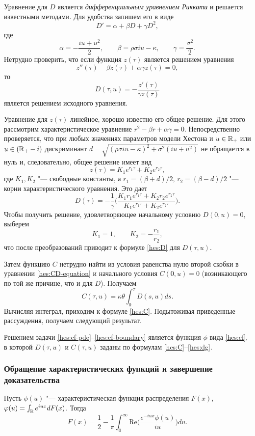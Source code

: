 Уравнение для $D$ является \emph{дифференциальным уравнением Риккати} и решается известными методами.
Для удобства запишем его в виде
\[
D'= \alpha + \beta D + \gamma D^2,
\]
где
\[
\alpha = -\frac{iu + u^2}{2},\qquad \beta = \rho\sigma iu - \kappa, \qquad
\gamma = \frac{\sigma^2}{2}.
\]
Нетрудно проверить, что если функция $z(\tau)$ является решением уравнения
\[
z''(\tau) - \beta z(\tau) + \alpha\gamma z(\tau)= 0,
\]
то
\[
D(\tau,u) = -\frac{z'(\tau)}{\gamma z(\tau)} 
\]
является решением исходного уравнения.

Уравнение для $z(\tau)$ линейное, хорошо известно его общее решение.
Для этого рассмотрим характеристическое уравнение $r^2-\beta r+\alpha\gamma = 0$.
Непосредственно проверяется, что при любых значениях параметров модели Хестона и $u\in\mathbb{R}_+$ или $u\in(\mathbb{R}_+-i)$ дискриминант $d = \sqrt{(\rho\sigma iu - \kappa)^2 + \sigma^2(iu + u^2)}$ не обращается в нуль и, следовательно, общее решение имеет вид
\[
z(\tau) = K_1 e^{r_1\tau} + K_2 e^{r_2\tau},
\]
где $K_1,K_2$ "--- свободные константы, а $r_1=(\beta+d)/2$, $r_2=(\beta-d)/2$ "--- корни характеристического уравнения.
Это дает
\[
D(\tau) = -\frac1\gamma \biggl(\frac{K_1 r_1 e^{r_1\tau} + K_2 r_2e^{r_2\tau}}{K_1 e^{r_1\tau} + K_2e^{r_2\tau}} \biggr).
\]
Чтобы получить решение, удовлетворяющее начальному условию $D(0,u)=0$, выберем
\[
K_1 = 1, \qquad K_2 = -\frac{r_1}{r_2},
\]
что после преобразований приводит к формуле \eqref{hes:D} для $D(\tau, u)$.

Затем функцию $C$ нетрудно найти из условия равенства нулю второй скобки в уравнении \eqref{hes:CD-equation} и начального условия $C(0,u)=0$ (возникающего по той же причине, что и для $D$).
Получаем
\[
C(\tau, u) = \kappa\theta \int_0^\tau D(s,u) ds.
\]
Вычисляя интеграл, приходим к формуле \eqref{hes:C}.
Подытоживая приведенные рассуждения, получаем следующий результат.

\begin{lemma}
Решением задачи \eqref{hes:cf-pde}--\eqref{hes:cf-boundary} является функция $\phi$ вида \eqref{hes:cf}, в которой $D(\tau,u)$ и $C(\tau,u)$ заданы по формулам \eqref{hes:C}--\eqref{hes:dg}.
\end{lemma}


\subsubsection{Обращение характеристических функций и завершение доказательства}

\begin{lemma} 
Пусть $\phi(u)$ "--- характеристическая функция распределения $F(x)$, \te\ $\varphi(u) = \int_{\mathbb{R}} e^{iu x} d F(x)$.
Тогда
\[
F(x) = \frac 12 - \frac1\pi 
\int_0^\infty \mathrm{Re}\biggl(\frac{e^{-iu x}\phi(u )}{iu}\biggr) d u.
\]
\end{lemma}

